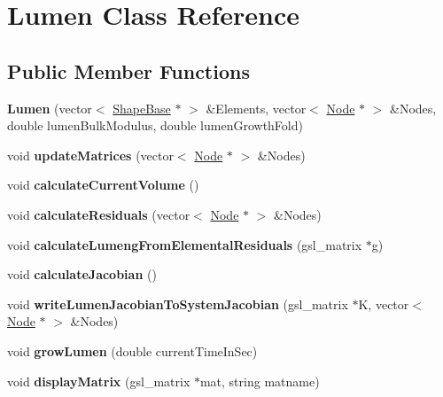 \hypertarget{classLumen}{}\section{Lumen Class Reference}
\label{classLumen}
\subsection*{Public Member Functions}
\begin{DoxyCompactItemize}
\item 
\hypertarget{classLumen_a539fc52d0c6eab34137852c56c07e904}{}{\bfseries Lumen} (vector$<$ \hyperlink{classShapeBase}{Shape\+Base} $\ast$ $>$ \&Elements, vector$<$ \hyperlink{classNode}{Node} $\ast$ $>$ \&Nodes, double lumen\+Bulk\+Modulus, double lumen\+Growth\+Fold)\label{classLumen_a539fc52d0c6eab34137852c56c07e904}

\item 
\hypertarget{classLumen_a01df50e50632e4638184f9a0bee3c4df}{}void {\bfseries update\+Matrices} (vector$<$ \hyperlink{classNode}{Node} $\ast$ $>$ \&Nodes)\label{classLumen_a01df50e50632e4638184f9a0bee3c4df}

\item 
\hypertarget{classLumen_a963000a9fe6fe932f6b5e910f5daf643}{}void {\bfseries calculate\+Current\+Volume} ()\label{classLumen_a963000a9fe6fe932f6b5e910f5daf643}

\item 
\hypertarget{classLumen_a047825741e85cb1fdd2a2322e8eae2c7}{}void {\bfseries calculate\+Residuals} (vector$<$ \hyperlink{classNode}{Node} $\ast$ $>$ \&Nodes)\label{classLumen_a047825741e85cb1fdd2a2322e8eae2c7}

\item 
\hypertarget{classLumen_a2f69044deddf63801acfbf6654cad9e2}{}void {\bfseries calculate\+Lumeng\+From\+Elemental\+Residuals} (gsl\+\_\+matrix $\ast$g)\label{classLumen_a2f69044deddf63801acfbf6654cad9e2}

\item 
\hypertarget{classLumen_afdce722ed9f77c0e4b2e218387b1baa5}{}void {\bfseries calculate\+Jacobian} ()\label{classLumen_afdce722ed9f77c0e4b2e218387b1baa5}

\item 
\hypertarget{classLumen_a985f386e1f8a0bebf781fc19efb372cc}{}void {\bfseries write\+Lumen\+Jacobian\+To\+System\+Jacobian} (gsl\+\_\+matrix $\ast$K, vector$<$ \hyperlink{classNode}{Node} $\ast$ $>$ \&Nodes)\label{classLumen_a985f386e1f8a0bebf781fc19efb372cc}

\item 
\hypertarget{classLumen_ae5370f84caf871df7353b9326ecc3d09}{}void {\bfseries grow\+Lumen} (double current\+Time\+In\+Sec)\label{classLumen_ae5370f84caf871df7353b9326ecc3d09}

\item 
\hypertarget{classLumen_a4f2fa202e4db36eee7fd61236c23ff34}{}void {\bfseries display\+Matrix} (gsl\+\_\+matrix $\ast$mat, string matname)\label{classLumen_a4f2fa202e4db36eee7fd61236c23ff34}

\end{DoxyCompactItemize}
